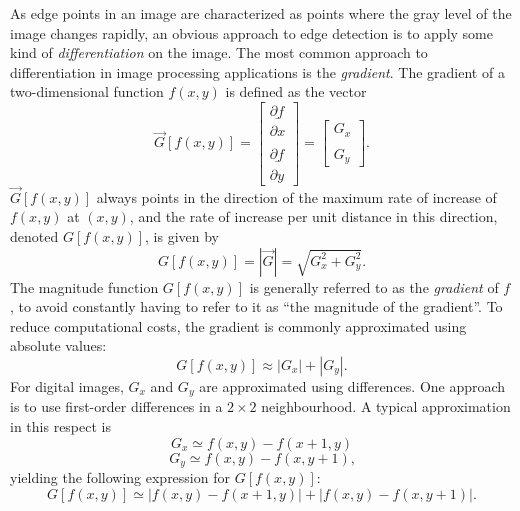 As edge points in an image are characterized as points where the gray
level of the image changes rapidly, an obvious approach to edge
detection is to apply some kind of {\em differentiation\/} on the
image.  The most common approach to differentiation in image
processing applications is the {\em gradient\/}.  The gradient of a
two-dimensional function $f(x,y)$ is defined as the vector
\begin{equation}
  \vec{G}[f(x,y)]=\left[
    \begin{array}{c}
      \underline{\partial f} \\
      \partial x \\ \\
      \underline{\partial f} \\
      \partial y
    \end{array}\right]=\left[
    \begin{array}{c}
      G_{x} \\ \\
      G_{y}
    \end{array}\right]\mbox{.}
\end{equation}
$\vec{G}[f(x,y)]$ always points in the direction of the maximum rate
of increase of $f(x,y)$ at $(x,y)$, and the rate of increase per unit
distance in this direction, denoted $G[f(x,y)]$, is given by
\begin{equation}
\label{eq:gradient:sqrt}
  G[f(x,y)]=|\vec{G}|=\sqrt{G_{x}^{2}+G_{y}^{2}}\mbox{.}
\end{equation}
The magnitude function $G[f(x,y)]$ is generally referred to as the
{\em gradient\/} of $f$, to avoid constantly having to refer to it as
``the magnitude of the gradient''.  To reduce computational costs, the
gradient is commonly approximated using absolute values:
\begin{equation}
\label{eq:gradient:abs}
  G[f(x,y)]\approx|G_{x}|+|G_{y}|\mbox{.}
\end{equation}
For digital images, $G_{x}$ and $G_{y}$ are approximated using
differences.  One approach is to use first-order differences in a
$2\times 2$ neighbourhood.  A typical approximation in this respect is
\begin{equation}
  G_{x}\simeq f(x,y)-f(x+1,y)
\end{equation}
\begin{equation}
  G_{y}\simeq f(x,y)-f(x,y+1)\mbox{,}
\end{equation}
yielding the following expression for $G[f(x,y)]$:
\begin{equation}
  G[f(x,y)]\simeq|f(x,y)-f(x+1,y)|+|f(x,y)-f(x,y+1)|\mbox{.}
\end{equation}

